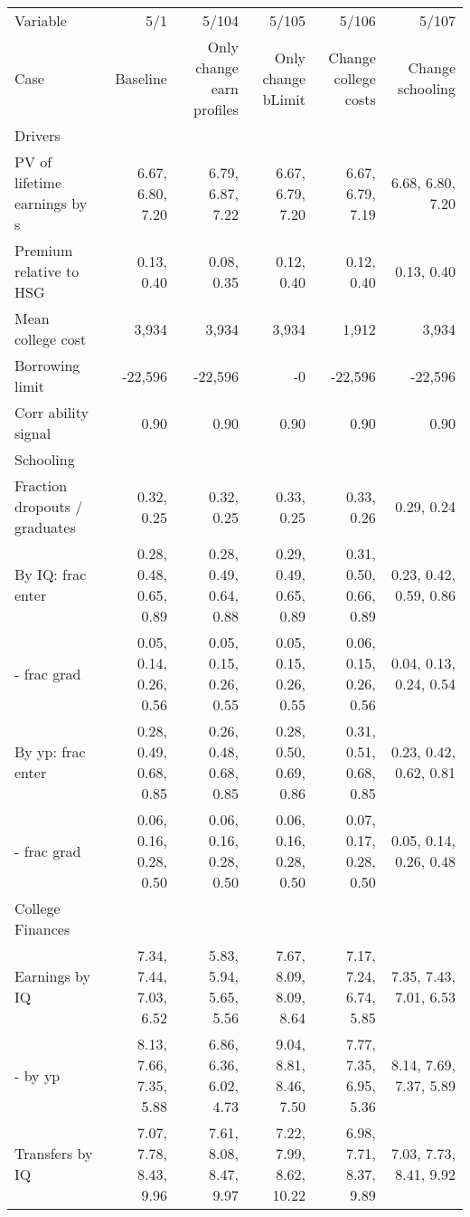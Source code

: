 \begin{tabular}{lrrrrr}
\hline
Variable & 5/1  & 5/104  & 5/105  & 5/106  & 5/107  \\ 
Case & Baseline  & Only change earn profiles  & Only change bLimit  & Change college costs  & Change schooling  \\ 
Drivers &   &   &   &   &   \\ 
PV of lifetime earnings by s & 6.67, 6.80, 7.20  & 6.79, 6.87, 7.22  & 6.67, 6.79, 7.20  & 6.67, 6.79, 7.19  & 6.68, 6.80, 7.20  \\ 
Premium relative to HSG & 0.13, 0.40  & 0.08, 0.35  & 0.12, 0.40  & 0.12, 0.40  & 0.13, 0.40  \\ 
Mean college cost & 3,934  & 3,934  & 3,934  & 1,912  & 3,934  \\ 
Borrowing limit & -22,596  & -22,596  & -0  & -22,596  & -22,596  \\ 
Corr ability signal & 0.90  & 0.90  & 0.90  & 0.90  & 0.90  \\ 
\hline
Schooling &   &   &   &   &   \\ 
Fraction dropouts / graduates & 0.32, 0.25  & 0.32, 0.25  & 0.33, 0.25  & 0.33, 0.26  & 0.29, 0.24  \\ 
By IQ: frac enter & 0.28, 0.48, 0.65, 0.89  & 0.28, 0.49, 0.64, 0.88  & 0.29, 0.49, 0.65, 0.89  & 0.31, 0.50, 0.66, 0.89  & 0.23, 0.42, 0.59, 0.86  \\ 
- frac grad & 0.05, 0.14, 0.26, 0.56  & 0.05, 0.15, 0.26, 0.55  & 0.05, 0.15, 0.26, 0.55  & 0.06, 0.15, 0.26, 0.56  & 0.04, 0.13, 0.24, 0.54  \\ 
By yp: frac enter & 0.28, 0.49, 0.68, 0.85  & 0.26, 0.48, 0.68, 0.85  & 0.28, 0.50, 0.69, 0.86  & 0.31, 0.51, 0.68, 0.85  & 0.23, 0.42, 0.62, 0.81  \\ 
- frac grad & 0.06, 0.16, 0.28, 0.50  & 0.06, 0.16, 0.28, 0.50  & 0.06, 0.16, 0.28, 0.50  & 0.07, 0.17, 0.28, 0.50  & 0.05, 0.14, 0.26, 0.48  \\ 
\hline
College Finances &   &   &   &   &   \\ 
Earnings by IQ & 7.34, 7.44, 7.03, 6.52  & 5.83, 5.94, 5.65, 5.56  & 7.67, 8.09, 8.09, 8.64  & 7.17, 7.24, 6.74, 5.85  & 7.35, 7.43, 7.01, 6.53  \\ 
- by yp & 8.13, 7.66, 7.35, 5.88  & 6.86, 6.36, 6.02, 4.73  & 9.04, 8.81, 8.46, 7.50  & 7.77, 7.35, 6.95, 5.36  & 8.14, 7.69, 7.37, 5.89  \\ 
Transfers by IQ & 7.07, 7.78, 8.43, 9.96  & 7.61, 8.08, 8.47, 9.97  & 7.22, 7.99, 8.62, 10.22  & 6.98, 7.71, 8.37, 9.89  & 7.03, 7.73, 8.41, 9.92  \\ 

\end{tabular}
